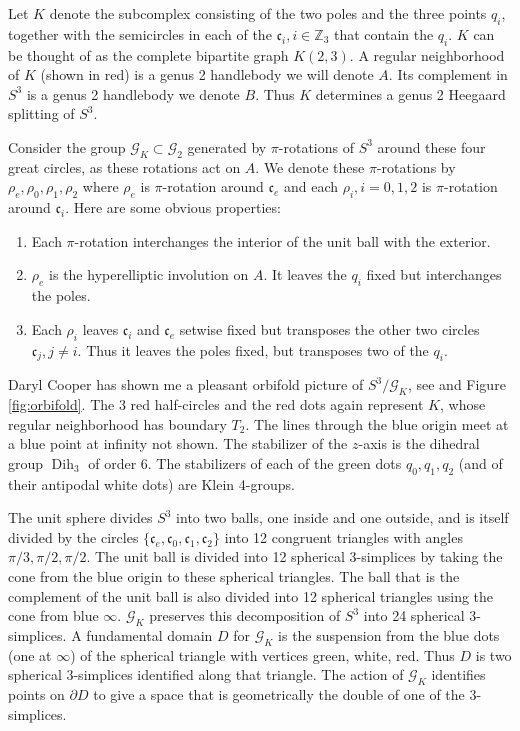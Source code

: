 \documentclass[12pt]{amsart}
\newcommand{\calG}{\mathcal G}
\newcommand{\bdd}{\mbox{$\partial$}}
\newcommand{\Dih}{\operatorname{Dih}}
\def\zed{{\mathbb Z}}
\newcommand{\frc}{\mbox{$\mathfrak{c}$}}
\begin{document}
Let $K$ denote the subcomplex consisting of the two poles and the three points $q_i$, together with the semicircles in each of the $\frc_i, i \in \zed_3$ that contain the 
$q_i$. $K$ can be thought of as the complete bipartite graph $K(2, 3)$.  A regular neighborhood of $K$ (shown in red) is a genus 2 handlebody we will denote $A$.  Its complement in $S^3$ is a genus 2 handlebody we denote $B$.  Thus $K$ determines a genus 2 Heegaard splitting of $S^3$.  

Consider the group $\calG_K \subset \calG_2$ generated by $\pi$-rotations of $S^3$ around these four great circles, as these rotations act on $A$.  We denote these $\pi$-rotations by $\rho_e, \rho_0, \rho_1, \rho_2$ where $\rho_e$ is $\pi$-rotation around $\frc_e$ and each $  \rho_i, i = 0, 1, 2$ is $\pi$-rotation around $\frc_i$.   Here are some obvious properties:

\begin{enumerate}
\item Each $\pi$-rotation interchanges the interior of the unit ball with the exterior.
\item $\rho_e$ is the hyperelliptic involution on $A$.  It leaves the $q_i$ fixed but interchanges the poles.
\item Each $\rho_i$ leaves $\frc_i$ and $\frc_e$ setwise fixed but transposes the other two circles $\frc_j, j \neq i$.  Thus it leaves the poles fixed, but transposes two of the $q_i$.
\end{enumerate}

Daryl Cooper \cite{Co} has shown me a pleasant orbifold picture of $S^3/\calG_K$, see \cite{CHK} and Figure \ref{fig:orbifold}.  The 3 red half-circles and the red dots again represent $K$, whose regular neighborhood has boundary $T_2$.  The lines through the blue origin meet at a blue point at infinity not shown.  The stabilizer of the $z$-axis is the dihedral group $\Dih_3$ of order 6.  The stabilizers of each of the green dots $q_0, q_1, q_2$ (and of their antipodal white dots) are Klein 4-groups.  

The unit sphere divides $S^3$ into two balls, one inside and one outside, and is itself divided by the circles $\{\frc_e, \frc_0, \frc_1, \frc_2\}$ into 12 congruent triangles with angles $\pi/3, \pi/2, \pi/2$.
The unit ball is divided into 12 spherical 3-simplices by taking the cone from the blue origin to
these spherical triangles.
The ball that is the complement of the unit ball is also divided into 12 spherical triangles using the cone from blue $\infty$.  $\calG_K$ preserves this decomposition of $S^3$ into 24 spherical 3-simplices.
A fundamental domain $D$ for $\calG_K$ is the suspension from the blue dots (one at $\infty$) of the spherical triangle with vertices green, white, red.  Thus $D$ is two spherical 3-simplices identified along that triangle.   The action of $\calG_K$ identifies points on $\bdd D$
to give a space that is geometrically the double of one of the 3-simplices.
\end{document}
